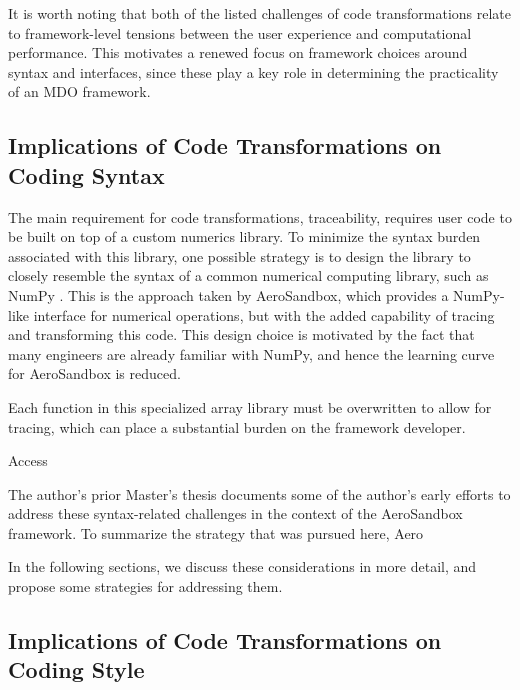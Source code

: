 It is worth noting that both of the listed challenges of code transformations relate to framework-level tensions between the user experience and computational performance. This motivates a renewed focus on framework choices around syntax and interfaces, since these play a key role in determining the practicality of an MDO framework.

\subsection{Implications of Code Transformations on Coding Syntax}
\label{sec:code_syntax}

The main requirement for code transformations, traceability, requires user code to be built on top of a custom numerics library. To minimize the syntax burden associated with this library, one possible strategy is to design the library to closely resemble the syntax of a common numerical computing library, such as NumPy \cite{numpy}. This is the approach taken by AeroSandbox, which provides a NumPy-like interface for numerical operations, but with the added capability of tracing and transforming this code. This design choice is motivated by the fact that many engineers are already familiar with NumPy, and hence the learning curve for AeroSandbox is reduced.

Each function in this specialized array library must be overwritten to allow for tracing, which can place a substantial burden on the framework developer. %

Access %

The author's prior Master's thesis \cite{sharpe_aerosandbox_2021} documents some of the author's early efforts to address these syntax-related challenges in the context of the AeroSandbox framework. To summarize the strategy that was pursued here, Aero


In the following sections, we discuss these considerations in more detail, and propose some strategies for addressing them.




\subsection{Implications of Code Transformations on Coding Style}
\label{sec:code_style}



